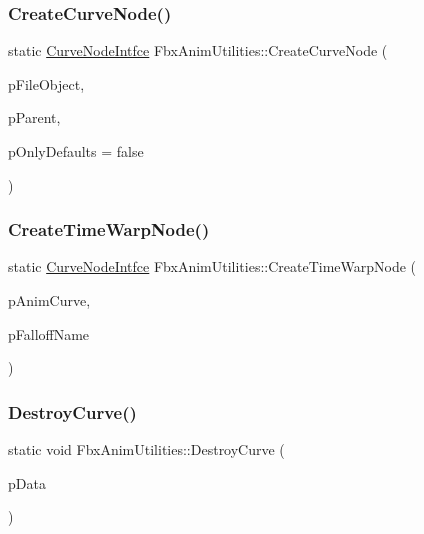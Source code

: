 \subsubsection{\texorpdfstring{Create\+Curve\+Node()}{CreateCurveNode()}\hspace{0.1cm}{\footnotesize\ttfamily [3/3]}}
{\footnotesize\ttfamily static \hyperlink{class_fbx_anim_utilities_1_1_curve_node_intfce}{Curve\+Node\+Intfce} Fbx\+Anim\+Utilities\+::\+Create\+Curve\+Node (\begin{DoxyParamCaption}\item[{\hyperlink{class_fbx_i_o}{Fbx\+IO} $\ast$}]{p\+File\+Object,  }\item[{\hyperlink{class_fbx_anim_utilities_1_1_curve_node_intfce}{Curve\+Node\+Intfce} \&}]{p\+Parent,  }\item[{bool}]{p\+Only\+Defaults = {\ttfamily false} }\end{DoxyParamCaption})\hspace{0.3cm}{\ttfamily [static]}}

\mbox{\label{class_fbx_anim_utilities_aad2561a0cb51decf1de8d1bdaf5ae288}} 
\subsubsection{\texorpdfstring{Create\+Time\+Warp\+Node()}{CreateTimeWarpNode()}}
{\footnotesize\ttfamily static \hyperlink{class_fbx_anim_utilities_1_1_curve_node_intfce}{Curve\+Node\+Intfce} Fbx\+Anim\+Utilities\+::\+Create\+Time\+Warp\+Node (\begin{DoxyParamCaption}\item[{\hyperlink{class_fbx_anim_curve}{Fbx\+Anim\+Curve} $\ast$}]{p\+Anim\+Curve,  }\item[{const char $\ast$}]{p\+Falloff\+Name }\end{DoxyParamCaption})\hspace{0.3cm}{\ttfamily [static]}}

\mbox{\label{class_fbx_anim_utilities_ac7f2b9fda23aceec40ed9416f768e207}} 
\subsubsection{\texorpdfstring{Destroy\+Curve()}{DestroyCurve()}}
{\footnotesize\ttfamily static void Fbx\+Anim\+Utilities\+::\+Destroy\+Curve (\begin{DoxyParamCaption}\item[{\hyperlink{class_fbx_anim_utilities_1_1_curve_intfce}{Curve\+Intfce} \&}]{p\+Data }\end{DoxyParamCaption})\hspace{0.3cm}{\ttfamily [static]}}

